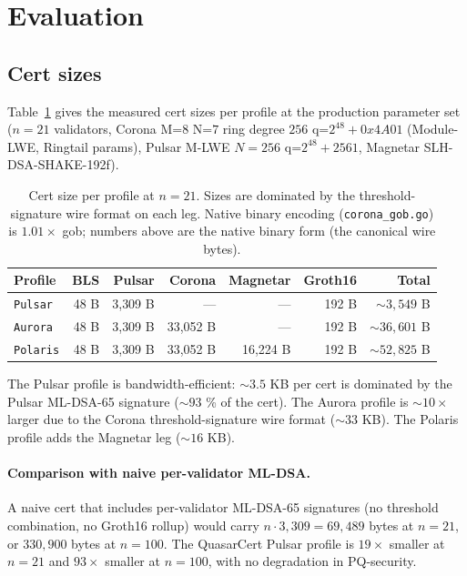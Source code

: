 \section{Evaluation}
\label{sec:eval}

\subsection{Cert sizes}

Table~\ref{tab:cert-sizes} gives the measured cert sizes per
profile at the production parameter set ($n = 21$ validators,
Corona M=$8$ N=$7$ ring degree $256$ q=$2^{48}+0x4A01$ (Module-LWE, Ringtail params), Pulsar M-LWE
$N = 256$ q=$2^{48}+2561$, Magnetar SLH-DSA-SHAKE-192f).

\begin{table}[ht]
\centering
\small
\begin{tabular}{@{}lrrrrrr@{}}
\toprule
\textbf{Profile} & \textbf{BLS} & \textbf{Pulsar} & \textbf{Corona} & \textbf{Magnetar} & \textbf{Groth16} & \textbf{Total} \\
\midrule
\texttt{Pulsar}  & 48 B  & 3{,}309 B & --- & --- & 192 B & ${\sim}3{,}549$ B \\
\texttt{Aurora}  & 48 B  & 3{,}309 B & 33{,}052 B & --- & 192 B & ${\sim}36{,}601$ B \\
\texttt{Polaris} & 48 B  & 3{,}309 B & 33{,}052 B & 16{,}224 B & 192 B & ${\sim}52{,}825$ B \\
\bottomrule
\end{tabular}
\caption{Cert size per profile at $n = 21$. Sizes are dominated by
the threshold-signature wire format on each leg. Native binary
encoding (\texttt{corona\_gob.go}) is $1.01\times$ gob; numbers
above are the native binary form (the canonical wire bytes).}
\label{tab:cert-sizes}
\end{table}

The Pulsar profile is bandwidth-efficient: $\sim 3.5$ KB per cert
is dominated by the Pulsar ML-DSA-65 signature ($\sim 93$ \% of
the cert). The Aurora profile is $\sim 10\times$ larger due to the
Corona threshold-signature wire format ($\sim 33$ KB). The
Polaris profile adds the Magnetar leg ($\sim 16$ KB).

\paragraph{Comparison with naive per-validator ML-DSA.}
A naive cert that includes per-validator ML-DSA-65 signatures (no
threshold combination, no Groth16 rollup) would carry $n \cdot
3{,}309 = 69{,}489$ bytes at $n = 21$, or $330{,}900$ bytes at
$n = 100$. The QuasarCert Pulsar profile is $19\times$ smaller at
$n = 21$ and $93\times$ smaller at $n = 100$, with no degradation
in PQ-security.

